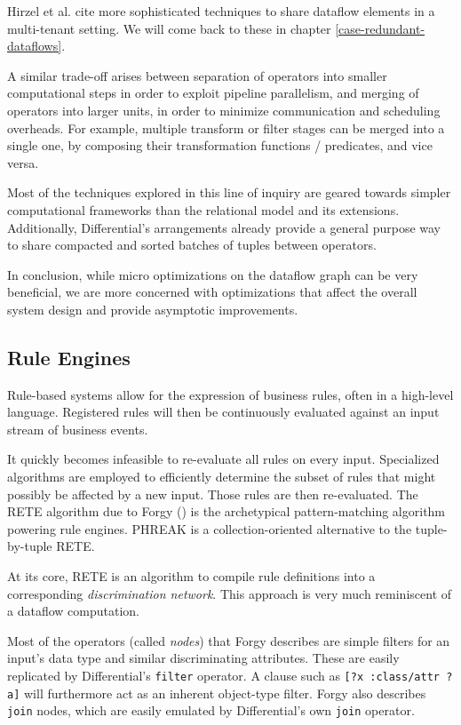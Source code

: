 \documentclass[../index.tex]{subfiles}
\begin{document}
Hirzel et al. cite more sophisticated techniques to share dataflow
elements in a multi-tenant setting. We will come back to these in
chapter \ref{case-redundant-dataflows}.

A similar trade-off arises between separation of operators into
smaller computational steps in order to exploit pipeline parallelism,
and merging of operators into larger units, in order to minimize
communication and scheduling overheads. For example, multiple
transform or filter stages can be merged into a single one, by
composing their transformation functions / predicates, and vice versa.

Most of the techniques explored in this line of inquiry are geared
towards simpler computational frameworks than the relational model and
its extensions. Additionally, Differential's arrangements already
provide a general purpose way to share compacted and sorted batches of
tuples between operators.

In conclusion, while micro optimizations on the dataflow graph can be
very beneficial, we are more concerned with optimizations that affect
the overall system design and provide asymptotic improvements.

\subsection{Rule Engines}

Rule-based systems allow for the expression of business rules, often
in a high-level language. Registered rules will then be continuously
evaluated against an input stream of business events.

It quickly becomes infeasible to re-evaluate all rules on every
input. Specialized algorithms are employed to efficiently determine
the subset of rules that might possibly be affected by a new
input. Those rules are then re-evaluated. The RETE algorithm due to
Forgy (\cite{forgy1989rete}) is the archetypical pattern-matching
algorithm powering rule engines. PHREAK \cite{drools} is a
collection-oriented alternative to the tuple-by-tuple RETE.

At its core, RETE is an algorithm to compile rule definitions into a
corresponding \emph{discrimination network}. This approach is very
much reminiscent of a dataflow computation.

Most of the operators (called \emph{nodes}) that Forgy describes are
simple filters for an input's data type and similar discriminating
attributes. These are easily replicated by Differential's
\texttt{filter} operator. A clause such as \texttt{[?x :class/attr
    ?a]} will furthermore act as an inherent object-type filter.
Forgy also describes \texttt{join} nodes, which are easily emulated by
Differential's own \texttt{join} operator.
\end{document}
